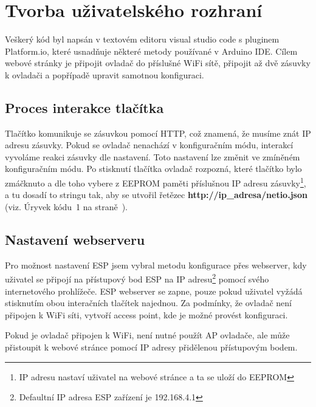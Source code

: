 \documentclass[a4paper, 12pt]{report}
\begin{document}
    \section{Tvorba uživatelského rozhraní}
    Veškerý kód byl napsán v textovém editoru visual studio code s pluginem Platform.io, které usnadňuje některé metody používané v Arduino IDE\@.
    Cílem webové stránky je připojit ovladač do příslušné WiFi sítě, připojit až dvě zásuvky k ovladači a popřípadě upravit samotnou konfiguraci.

    \subsection{Proces interakce tlačítka}
    Tlačítko komunikuje se zásuvkou pomocí HTTP, což znamená, že musíme znát IP adresu zásuvky.
    Pokud se ovladač nenachází v konfiguračním módu, interakcí vyvoláme reakci zásuvky dle nastavení.
    Toto nastavení lze změnit ve zmíněném konfiguračním módu.
    Po stisknutí tlačítka ovladač rozpozná, které tlačítko bylo zmáčknuto a dle toho vybere z EEPROM paměti příslušnou IP adresu zásuvky\footnote{IP adresu nastaví uživatel na webové stránce a ta se uloží do EEPROM}, a tu dosadí to stringu tak, aby se utvořil řetězec \textbf{http://ip\_adresa/netio.json} (viz. Úryvek kódu~1 na straně~\pageref{listing:http}).
    \subsection{Nastavení webserveru}
    Pro možnost nastavení ESP jsem vybral metodu konfigurace přes webserver, kdy uživatel se připojí na přístupový bod ESP na IP adresu\footnote{Defaultní IP adresa ESP zařízení je 192.168.4.1} pomocí svého internetového prohlížeče.
    ESP webserver se zapne, pouze pokud uživatel vyžádá stisknutím obou interačních tlačítek najednou.
    Za podmínky, že ovladač není připojen k WiFi síti, vytvoří access point, kde je možné provést konfiguraci.\par
    Pokud je ovladač připojen k WiFi, není nutné použít AP ovladače, ale může přistoupit k webové stránce pomocí IP adresy přidělenou přístupovým bodem.
\end{document}
